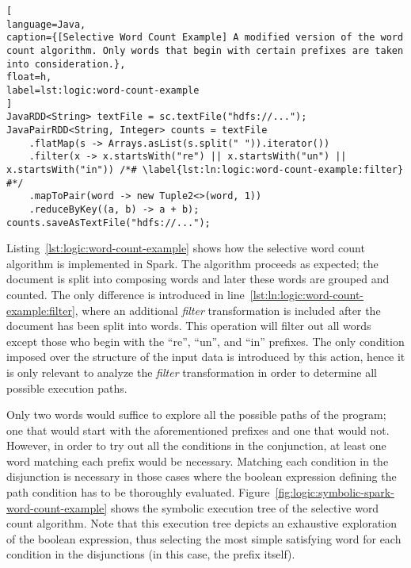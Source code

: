 \begin{lstlisting}[
language=Java,
caption={[Selective Word Count Example] A modified version of the word count algorithm. Only words that begin with certain prefixes are taken into consideration.},
float=h,
label=lst:logic:word-count-example
]
JavaRDD<String> textFile = sc.textFile("hdfs://...");
JavaPairRDD<String, Integer> counts = textFile
	.flatMap(s -> Arrays.asList(s.split(" ")).iterator())
	.filter(x -> x.startsWith("re") || x.startsWith("un") || x.startsWith("in")) /*# \label{lst:ln:logic:word-count-example:filter} #*/	
	.mapToPair(word -> new Tuple2<>(word, 1))
	.reduceByKey((a, b) -> a + b);	
counts.saveAsTextFile("hdfs://...");
\end{lstlisting}

Listing~\ref{lst:logic:word-count-example} shows how the selective word count algorithm is implemented in Spark. The algorithm proceeds as expected; the document is split into composing words and later these words are grouped and counted. The only difference is introduced in line~\ref{lst:ln:logic:word-count-example:filter}, where an additional \textit{filter} transformation is included after the document has been split into words. This operation will filter out all words except those who begin with the ``re'', ``un'', and ``in'' prefixes. The only condition imposed over the structure of the input data is introduced by this action, hence it is only relevant to analyze the \textit{filter} transformation in order to determine all possible execution paths.

Only two words would suffice to explore all the possible paths of the program; one that would start with the aforementioned prefixes and one that would not. However, in order to try out all the conditions in the conjunction, at least one word matching each prefix would be necessary. Matching each condition in the disjunction is necessary in those cases where the boolean expression defining the path condition has to be thoroughly evaluated. Figure~\ref{fig:logic:symbolic-spark-word-count-example} shows the symbolic execution tree of the selective word count algorithm. Note that this execution tree depicts an exhaustive exploration of the boolean expression, thus selecting the most simple satisfying word for each condition in the disjunctions (in this case, the prefix itself).

